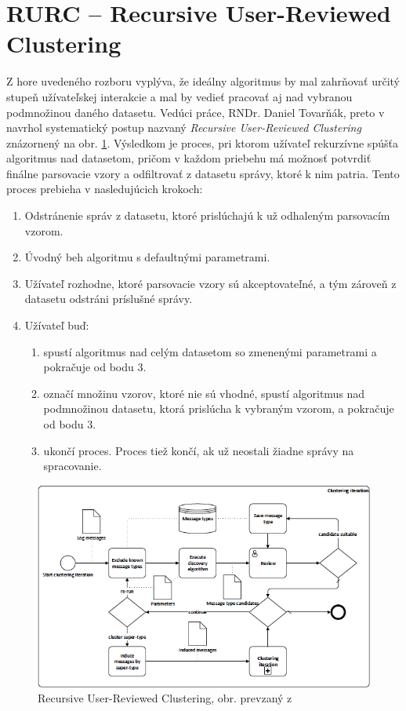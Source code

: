 \section{RURC -- Recursive User-Reviewed Clustering}
\label{sec:rurc}
Z hore uvedeného rozboru vyplýva, že ideálny algoritmus by mal zahrňovať určitý stupeň užívateľskej interakcie a mal by vedieť pracovať aj nad vybranou podmnožinou daného datasetu. Vedúci práce, RNDr. Daniel Tovarňák, preto v \parencite{Tovarnak2017} navrhol systematický postup nazvaný \emph{Recursive User-Reviewed Clustering} znázornený na obr. \ref{fig:rurc}. Výsledkom je proces, pri ktorom užívateľ rekurzívne spúšťa algoritmus nad datasetom, pričom v každom priebehu má možnosť potvrdiť finálne parsovacie vzory a odfiltrovať z datasetu správy, ktoré k nim patria. Tento proces prebieha v nasledujúcich krokoch:

\begin{enumerate}
  \item Odstránenie správ z datasetu, ktoré prislúchajú k už odhaleným parsovacím vzorom.
  \item Úvodný beh algoritmu s defaultnými parametrami.
  \item Užívateľ rozhodne, ktoré parsovacie vzory sú akceptovateľné, a tým zároveň z datasetu odstráni príslušné správy.
  \item Užívateľ buď:
  	\begin{enumerate}
   		 \item spustí algoritmus nad celým datasetom so zmenenými parametrami a pokračuje od bodu 3.
   		 \item označí množinu vzorov, ktoré nie sú vhodné, spustí algoritmus nad podmnožinou datasetu, ktorá prislúcha k vybraným vzorom, a 				pokračuje od bodu 3.
   		 \item ukončí proces. Proces tiež končí, ak už neostali žiadne správy na spracovanie.
 	 \end{enumerate}
\end{enumerate}

\begin{figure}[htbp]
 \centering 
 \begin{minipage}{0.95\linewidth}
 	\centering
 	\includegraphics[width=\textwidth]{images/RURC.png} 	
 \end{minipage}
  \caption{Recursive User-Reviewed Clustering, obr. prevzaný z  \parencite{Tovarnak2017}}
  \label{fig:rurc}
\end{figure}


